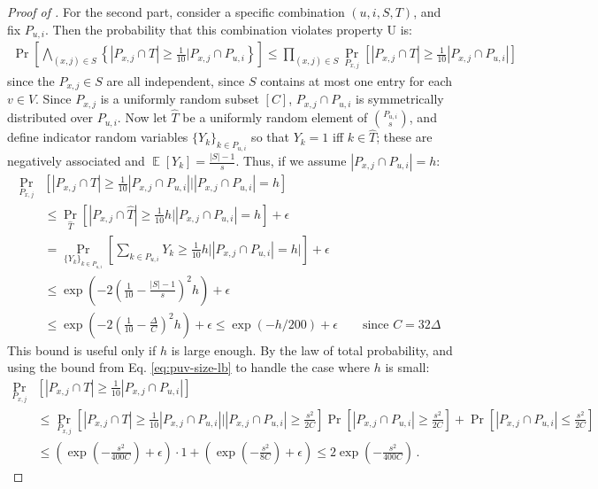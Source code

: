 \documentclass[10pt]{article}
\theoremstyle{definition}\newtheorem{definition}[lemma]{Definition}
\theoremstyle{remark}  \newtheorem*{remark}{Remark}
\DeclareMathOperator{\EE}{\mathbb{E}}
\begin{document}
\begin{proof}[Proof of ]
  For the second part, consider a specific combination $(u,i,S,T)$, and fix $P_{u,i}$. Then the probability that this combination violates property U is:
  \begin{align}
    \Pr\left[ \bigwedge_{(x,j) \in S} \left\{ |P_{x,j} \cap T| \ge \frac{1}{10} |P_{x,j} \cap P_{u,i}\right\} \right] \le \prod_{(x,j) \in S} \Pr_{P_{x,j}}\left[ |P_{x,j} \cap T| \ge \frac{1}{10} |P_{x,j} \cap P_{u,i} | \right] \label{eq:superhall-specific}
  \end{align}
  since the $P_{x,j} \in S$ are all independent, since $S$ contains at most one entry for each $v \in V$. Since $P_{x,j}$ is a uniformly random subset $[C]$,
  $P_{x,j} \cap P_{u,i}$ is symmetrically distributed over $P_{u,i}$. Now let $\hat{T}$ be a uniformly random element of $\binom{P_{u,i}}{s}$, and define indicator random variables $\{Y_k\}_{k \in P_{u,i}}$ so that $Y_k = 1$ iff $k \in \hat{T}$; these are negatively associated and $\EE[Y_k] = \frac{|S| - 1}{s}$. Thus, if we assume $|P_{x,j} \cap P_{u,i}| = h$:
  \begin{align*}
    \Pr_{P_{x,j}}&\left[ |P_{x,j} \cap T| \ge \frac{1}{10} |P_{x,j} \cap P_{u,i} |  \Big| |P_{x,j} \cap P_{u,i}| = h\right] \\
      &\le \Pr_{\hat{T}}\left[ |P_{x,j} \cap \hat{T}| \ge \frac{1}{10} h \Big| |P_{x,j} \cap P_{u,i}| = h \right] + \epsilon \\
      &= \Pr_{\{Y_k\}_{k \in P_{u,i}}}\left[ \sum_{k \in P_{u,i}} Y_k \ge \frac{1}{10} h \Big| |P_{x,j} \cap P_{u,i}| = h | \right] + \epsilon \\
      &\le \exp\left( -2 \left(\frac{1}{10} - \frac{|S| - 1}{s} \right)^2 h \right) + \epsilon \\
      &\le \exp\left( -2 \left(\frac{1}{10} - \frac{\Delta}{C} \right)^2 h \right) + \epsilon \le \exp\left( - h / 200 \right) + \epsilon  \qquad \text{since $C = 32 \Delta$}
  \end{align*}
  This bound is useful only if $h$ is large enough. By the law of total probability, and using the bound from Eq. \ref{eq:puv-size-lb} to handle the case where $h$ is small:
  \begin{align*}
    \Pr_{P_{x,j}}&\left[ |P_{x,j} \cap T| \ge \frac{1}{10} |P_{x,j} \cap P_{u,i} | \right] \\
      &\le \Pr_{P_{x,j}}\left[ |P_{x,j} \cap T| \ge \frac{1}{10} |P_{x,j} \cap P_{u,i} | \Big| |P_{x,j} \cap P_{u,i}| \ge \frac{s^2}{2 C} \right]\Pr\left[|P_{x,j} \cap P_{u,i}| \ge \frac{s^2}{2 C}\right]
        + \Pr\left[|P_{x,j} \cap P_{u,i}| \le \frac{s^2}{2 C}\right] \\
        &\le (\exp\left( - \frac{s^2}{400C} \right) + \epsilon)\cdot 1 + (\exp(-\frac{s^2}{8 C}) + \epsilon)
        \le 2 \exp\left( - \frac{s^2}{400C} \right) \,.
  \end{align*}
  

\end{proof}
\end{document}
